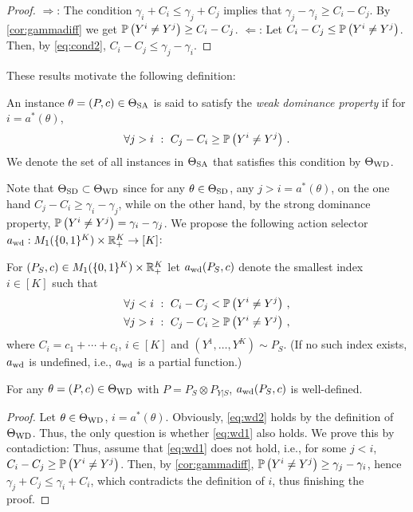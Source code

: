 \begin{proof}
\noindent $\Rightarrow$: The condition $\gamma_i + C_i \le \gamma_j + C_j$ implies that $\gamma_j -\gamma_i \ge C_i - C_j$.
By \cref{cor:gammadiff} we get $\mathbb{P}\left(Y^i \ne Y^j\right) \ge C_i - C_j$.
\noindent $\Leftarrow$: Let $C_i - C_j \le \mathbb{P}\left(Y^i \ne Y^j\right)$. Then, by \eqref{eq:cond2}, $C_i - C_j \le \gamma_j - \gamma_i$.
\end{proof}
These results motivate the following definition:
\begin{defi}
	An instance $\theta = (P,c)\in \Theta_{\mathrm{SA}}$  is said to satisfy the \emph{weak dominance property} if 
	for $i = a^*(\theta)$,
	\begin{align}
	\label{eq:wd} \forall j>i\,\,: \,\, C_j - C_i \ge \mathbb{P}\left(Y^i\ne Y^j\right)\,.
	\end{align}
We denote the set of all instances in $\Theta_{\mathrm{SA}}$ that satisfies this condition by $\Theta_{\mathrm{WD}}$.	
\end{defi}
Note that $\Theta_{\mathrm{SD}}\subset \Theta_{\mathrm{WD}}$ since for any $\theta\in \Theta_{\mathrm{SD}}$, any $j>i = a^*(\theta)$, on the one hand $C_j - C_i \ge \gamma_i - \gamma_j$, while on the other hand, by the strong dominance property, $\mathbb{P}\left(Y^i\ne Y^j\right) = \gamma_i - \gamma_j$.
We propose the following action selector $a_{\mathrm{wd}}: M_1(\{0,1\}^K) \times \mathbb{R}_+^K \to [K]$:
\begin{defi}\label{def:awd}
For $(P_S,c) \in M_1(\{0,1\}^K) \times \mathbb{R}_+^K$ let $a_{\mathrm{wd}}(P_S,c)$ denote the smallest index $i\in [K]$ such that
\begin{subequations}
\begin{align}
\forall j<i \,\,:\,\, C_i - C_j < \mathbb{P}\left( Y^i \ne Y^j \right)\,, \label{eq:wd1}\\ 
\forall j>i \,\,:\,\, C_j - C_i \ge \mathbb{P}\left( Y^i \ne Y^j \right)\,, \label{eq:wd2}
\end{align}
\end{subequations}
where $C_i = c_1+\cdots + c_i$, $i\in [K]$ and $(Y^1,\dots,Y^K) \sim P_S$.
(If no such index exists, $a_{\mathrm{wd}}$ is undefined, i.e., $a_{\mathrm{wd}}$ is a partial function.)
\end{defi}
\begin{prop}
\label{prop:awdwelldef}
For any $\theta = (P,c)\in \Theta_{\mathrm{WD}}$ with $P = P_S\otimes P_{Y|S}$, $a_{\mathrm{wd}}(P_S,c)$ is well-defined.
\end{prop}
\begin{proof}
Let $\theta\in \Theta_{\mathrm{WD}}$, $i = a^*(\theta)$. Obviously, \eqref{eq:wd2} holds by the definition of $\Theta_{\mathrm{WD}}$.
Thus, the only question is whether \eqref{eq:wd1} also holds.
We prove this by contadiction:
Thus, assume that \eqref{eq:wd1} does not hold, i.e., for some $j<i$, $C_i-C_j \ge \mathbb{P}\left(Y^i \ne Y^j\right)$. Then, by \cref{cor:gammadiff}, $\mathbb{P}\left( Y^i \ne Y^j\right) \ge \gamma_j - \gamma_i$, hence $\gamma_j + C_j \le \gamma_i + C_i$, which contradicts the definition of $i$, thus finishing the proof.
\end{proof}
